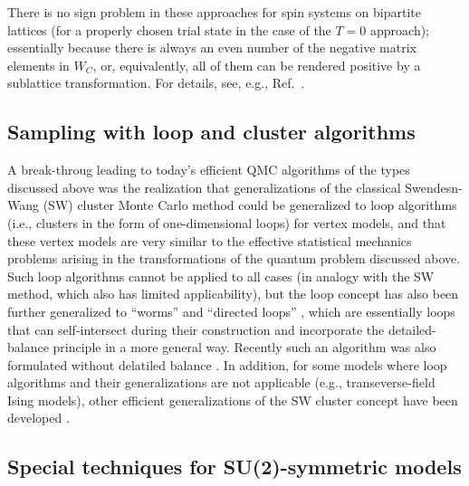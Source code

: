 \documentclass[range]{ar2e}
\begin{document}
There is no sign problem in these approaches for spin systems on bipartite lattices (for a properly chosen trial state in the case of the $T=0$ approach); 
essentially because there is always an even number of the negative matrix elements in $W_C$, or, equivalently, all of them can be rendered positive by a 
sublattice transformation. For details, see, e.g., Ref.~\cite{Henelius00}.

\subsection{Sampling with loop and cluster algorithms}

A break-throug leading to today's efficient QMC algorithms of the types discussed above
was the realization \cite{Evertz93} that generalizations of the classical Swendesn-Wang (SW) cluster 
Monte Carlo method \cite{Swendsen88} could be generalized to loop algorithms (i.e., clusters in the form of one-dimensional loops) for vertex models, and that 
these vertex models are very similar to the effective statistical mechanics problems arising in the transformations of the quantum problem discussed above. Such 
loop algorithms cannot be applied to all cases (in analogy with the SW method, which also has limited applicability), but the loop concept has also been further 
generalized to ``worms'' \cite{Prokofev96,Prokofev98, WormA} and ``directed loops'' \cite{Sandvik99,Syljuasen02}, which are essentially loops that can self-intersect
during their construction and incorporate the detailed-balance principle in a more general way. Recently such an algorithm was also formulated without
delatiled balance \cite{Suwa10}. In addition, for some models where loop algorithms and their generalizations are not applicable (e.g., transeverse-field 
Ising models), other efficient generalizations of the SW cluster concept have been developed \cite{Rieger99,Sandvik03}.

\subsection{Special techniques for SU(2)-symmetric models}
\label{su2method}
\end{document}

